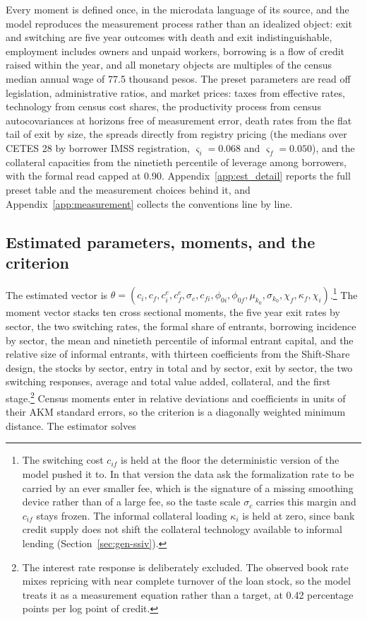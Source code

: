 \documentclass[12pt]{article}
\begin{document}
Every moment is defined once, in the microdata language of its source, and the model reproduces the measurement process rather than an idealized object: exit and switching are five year outcomes with death and exit indistinguishable, employment includes owners and unpaid workers, borrowing is a flow of credit raised within the year, and all monetary objects are multiples of the census median annual wage of 77.5 thousand pesos. The preset parameters are read off legislation, administrative ratios, and market prices: taxes from effective rates, technology from census cost shares, the productivity process from census autocovariances at horizons free of measurement error, death rates from the flat tail of exit by size, the spreads directly from registry pricing (the medians over CETES 28 by borrower IMSS registration, $\varsigma_i = 0.068$ and $\varsigma_f = 0.050$), and the collateral capacities from the ninetieth percentile of leverage among borrowers, with the formal read capped at 0.90. Appendix~\ref{app:est_detail} reports the full preset table and the measurement choices behind it, and Appendix~\ref{app:measurement} collects the conventions line by line.

\subsection{Estimated parameters, moments, and the criterion}
\label{sec:est-core}

The estimated vector is $\theta=(c_{i},c_{f},c^{e}_{i},c^{e}_{f},\sigma_{c},c_{fi},\phi_{0i},\phi_{0f},\mu_{k_{0}},\sigma_{k_{0}},\chi_{f},\kappa_{f},\chi_{i})$.\footnote{The switching cost $c_{if}$ is held at the floor the deterministic version of the model pushed it to. In that version the data ask the formalization rate to be carried by an ever smaller fee, which is the signature of a missing smoothing device rather than of a large fee, so the taste scale $\sigma_{c}$ carries this margin and $c_{if}$ stays frozen. The informal collateral loading $\kappa_{i}$ is held at zero, since bank credit supply does not shift the collateral technology available to informal lending (Section~\ref{sec:gen-ssiv}).} The moment vector stacks ten cross sectional moments, the five year exit rates by sector, the two switching rates, the formal share of entrants, borrowing incidence by sector, the mean and ninetieth percentile of informal entrant capital, and the relative size of informal entrants, with thirteen coefficients from the Shift-Share design, the stocks by sector, entry in total and by sector, exit by sector, the two switching responses, average and total value added, collateral, and the first stage.\footnote{The interest rate response is deliberately excluded. The observed book rate mixes repricing with near complete turnover of the loan stock, so the model treats it as a measurement equation rather than a target, at 0.42 percentage points per log point of credit.} Census moments enter in relative deviations and coefficients in units of their AKM standard errors, so the criterion is a diagonally weighted minimum distance. The estimator solves
\end{document}
